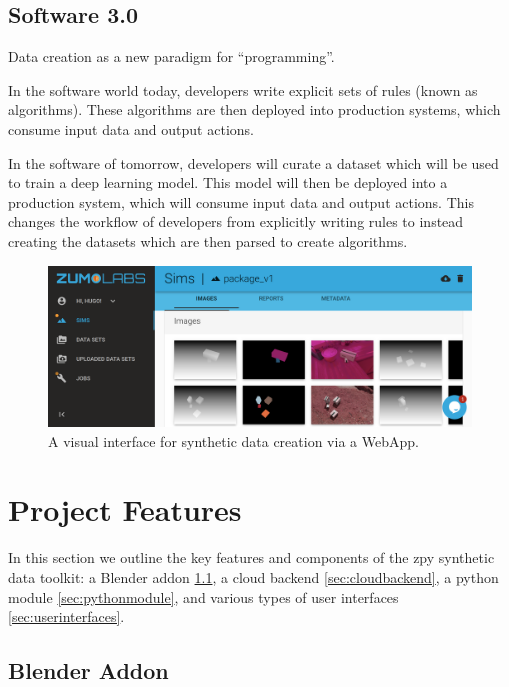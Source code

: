 \documentclass{article}
\begin{document}
\subsection{Software 3.0}
\label{sec:software3.0}

Data creation as a new paradigm for “programming”.

In the software world today, developers write explicit sets of rules (known as algorithms). These algorithms are then deployed into production systems, which consume input data and output actions.

In the software of tomorrow, developers will curate a dataset which will be used to train a deep learning model. This model will then be deployed into a production system, which will consume input data and output actions. This changes the workflow of developers from explicitly writing rules to instead creating the datasets which are then parsed to create algorithms.

\begin{figure}
	\centering
	\includegraphics[width=\textwidth]{webapp.png}
	\caption{A visual interface for synthetic data creation via a WebApp.}
	\label{fig:webapp}
\end{figure}

\section{Project Features}
\label{sec:projectfeatures}

In this section we outline the key features and components of the zpy synthetic data toolkit: a Blender addon \ref{sec:blenderaddon}, a cloud backend \ref{sec:cloudbackend}, a python module \ref{sec:pythonmodule}, and various types of user interfaces \ref{sec:userinterfaces}.

\subsection{Blender Addon}
\label{sec:blenderaddon}
\end{document}
